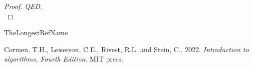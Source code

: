 \documentclass[dvipsnames]{article}
\begin{document}
\begin{enumerate}
\begin{proof}
    \emph {QED.}\\


  \end{proof}
  \color{black}

\end{enumerate}

\begin{thebibliography}{TheLongestRefName}

Cormen, T.H., Leiserson, C.E., Rivest, R.L. and Stein, C., 2022. \emph{Introduction to algorithms, Fourth Edition}. MIT press.

\end{thebibliography}
\end{document}
